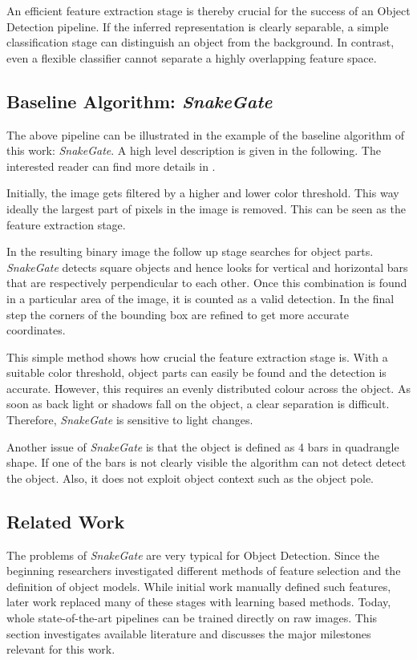 An efficient feature extraction stage is thereby crucial for the success of an Object Detection pipeline. If the inferred representation is clearly separable, a simple classification stage can distinguish an object from the background. In contrast, even a flexible classifier cannot separate a highly overlapping feature space.

\subsection{Baseline Algorithm: \textit{SnakeGate}}

The above pipeline can be illustrated in the example of the baseline algorithm of this work: \textit{SnakeGate}. A high level description is given in the following. The interested reader can find more details in \cite{Li2018b}.

Initially, the image gets filtered by a higher and lower color threshold. This way ideally the largest part of pixels in the image is removed. This can be seen as the feature extraction stage.

In the resulting binary image the follow up stage searches for object parts. \textit{SnakeGate} detects square objects and hence looks for vertical and horizontal bars that are respectively perpendicular to each other. Once this combination is found in a particular area of the image, it is counted as a valid detection. In the final step the corners of the bounding box are refined to get more accurate coordinates.

This simple method shows how crucial the feature extraction stage is. With a suitable color threshold, object parts can easily be found and the detection is accurate. However, this requires an evenly distributed colour across the object. As soon as back light or shadows fall on the object, a clear separation is difficult. Therefore, \textit{SnakeGate} is sensitive to light changes.

Another issue of \textit{SnakeGate} is that the object is defined as 4 bars in quadrangle shape. If one of the bars is not clearly visible the algorithm can not detect detect the object. Also, it does not exploit object context such as the object pole. 

\subsection{Related Work}

The problems of \textit{SnakeGate} are very typical for Object Detection. Since the beginning researchers investigated different methods of feature selection and the definition of object models. While initial work manually defined such features, later work replaced many of these stages with learning based methods. Today, whole state-of-the-art pipelines can be trained directly on raw images. This section investigates available literature and discusses the major milestones relevant for this work.

